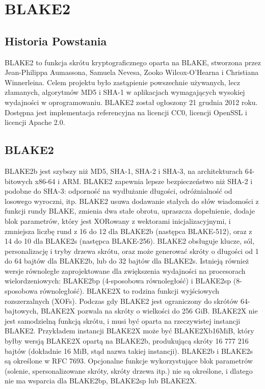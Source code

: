 \documentclass[12pt, a4paper]{article}
\begin{document}
\section{BLAKE2}
\subsection{Historia Powstania}
BLAKE2 to funkcja skrótu kryptograficznego oparta na BLAKE, stworzona przez Jean-Philippa Aumassona, Samuela Nevesa, Zooko Wilcox-O'Hearna i Christiana Winnerleina. Celem projektu było zastąpienie powszechnie używanych, lecz złamanych, algorytmów MD5 i SHA-1 w aplikacjach wymagających wysokiej wydajności w oprogramowaniu. BLAKE2 został ogłoszony 21 grudnia 2012 roku. Dostępna jest implementacja referencyjna na licencji CC0, licencji OpenSSL i licencji Apache 2.0.

\subsection{BLAKE2}
BLAKE2b jest szybszy niż MD5, SHA-1, SHA-2 i SHA-3, na architekturach 64-bitowych x86-64 i ARM. BLAKE2 zapewnia lepsze bezpieczeństwo niż SHA-2 i podobne do SHA-3: odporność na wydłużanie długości, odróżnialność od losowego wyroczni, itp.
BLAKE2 usuwa dodawanie stałych do słów wiadomości z funkcji rundy BLAKE, zmienia dwa stałe obrotu, upraszcza dopełnienie, dodaje blok parametrów, który jest XORowany z wektorami inicjalizacyjnymi, i zmniejsza liczbę rund z 16 do 12 dla BLAKE2b (następca BLAKE-512), oraz z 14 do 10 dla BLAKE2s (następca BLAKE-256).
BLAKE2 obsługuje klucze, sól, personalizację i tryby drzewa skrótu, oraz może generować skróty o długości od 1 do 64 bajtów dla BLAKE2b, lub do 32 bajtów dla BLAKE2s. Istnieją również wersje równoległe zaprojektowane dla zwiększenia wydajności na procesorach wielordzeniowych: BLAKE2bp (4-sposobowa równoległość) i BLAKE2sp (8-sposobowa równoległość).
BLAKE2X to rodzina funkcji wyjściowych rozszerzalnych (XOFs). Podczas gdy BLAKE2 jest ograniczony do skrótów 64-bajtowych, BLAKE2X pozwala na skróty o wielkości do 256 GiB. BLAKE2X nie jest samodzielną funkcją skrótu, i musi być oparta na rzeczywistej instancji BLAKE2. Przykładem instancji BLAKE2X może być BLAKE2Xb16MiB, który byłby wersją BLAKE2X opartą na BLAKE2b, produkującą skróty 16 777 216 bajtów (dokładnie 16 MiB, stąd nazwa takiej instancji).
BLAKE2b i BLAKE2s są określone w RFC 7693. Opcjonalne funkcje wykorzystujące blok parametrów (solenie, spersonalizowane skróty, skróty drzewa itp.) nie są określone, i dlatego nie ma wsparcia dla BLAKE2bp, BLAKE2sp lub BLAKE2X.
\end{document}
